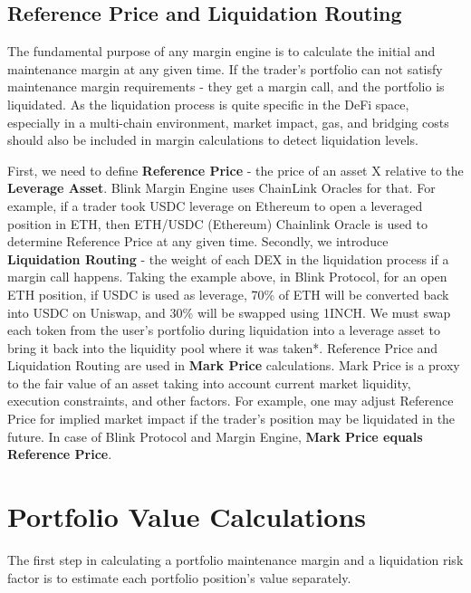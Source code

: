 \documentclass[conference]{IEEEtran}
\begin{document}
\subsection{Reference Price and Liquidation Routing}
The fundamental purpose of any margin engine is to calculate the initial and maintenance margin at any given time. If the trader's portfolio can not satisfy maintenance margin requirements -  they get a margin call, and the portfolio is liquidated. As the liquidation process is quite specific in the DeFi space, especially in a multi-chain environment, market impact, gas, and bridging costs should also be included in margin calculations to detect liquidation levels.

First, we need to define \textbf {Reference Price} - the price of an asset X relative to the \textbf{Leverage Asset}. Blink Margin Engine uses ChainLink Oracles for that. For example, if a trader took USDC leverage on Ethereum to open a leveraged position in ETH, then ETH/USDC (Ethereum) Chainlink Oracle is used to determine Reference Price at any given time. Secondly, we introduce \textbf {Liquidation Routing} - the weight of each DEX in the liquidation process if a margin call happens. Taking the example above, in Blink Protocol, for an open ETH position, if USDC is used as leverage, 70\% of ETH will be converted back into USDC on Uniswap, and 30\% will be swapped using 1INCH. We must swap each token from the user's portfolio during liquidation into a leverage asset to bring it back into the liquidity pool where it was taken*. Reference Price and Liquidation Routing are used in \textbf{Mark Price} calculations. Mark Price is a proxy to the fair value of an asset taking into account current market liquidity, execution constraints, and other factors. For example, one may adjust Reference Price for implied market impact if the trader's position may be liquidated in the future. In case of Blink Protocol and Margin Engine, \textbf{Mark Price equals Reference Price}.

\thispagestyle{fancy}


\section{Portfolio Value Calculations}

The first step in calculating a portfolio maintenance margin and a liquidation risk factor is to estimate each portfolio position's value separately.
\end{document}
